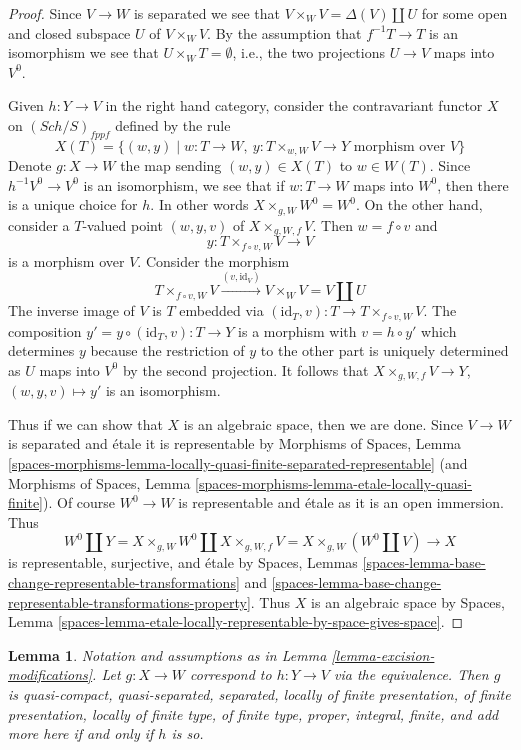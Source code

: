 \documentclass{stacks-project}
\theoremstyle{plain}
\newtheorem{lemma}[subsection]{Lemma}
\theoremstyle{definition}
\theoremstyle{remark}
\numberwithin{equation}{subsection}
\def\Sch{\mathit{Sch}}
\begin{document}
\begin{proof}
Since $V \to W$ is separated we see that
$V \times_W V = \Delta(V) \amalg U$ for some open and closed subspace
$U$ of $V \times_W V$. By the assumption that $f^{-1}T \to T$ is an
isomorphism we see that $U \times_W T = \emptyset$, i.e., the two
projections $U \to V$ maps into $V^0$.

\medskip\noindent
Given $h : Y \to V$ in the right hand category, consider the
contravariant functor $X$ on $(\Sch/S)_{fppf}$ defined by the rule
$$
X(T) = \{(w, y) \mid
w :  T \to W,\ y : T \times_{w, W} V \to Y\text{ morphism over }V\}
$$
Denote $g : X \to W$ the map sending $(w, y) \in X(T)$ to $w \in W(T)$.
Since $h^{-1}V^0 \to V^0$ is an isomorphism, we see that if
$w : T \to W$ maps into $W^0$, then there is a unique choice for $h$.
In other words $X \times_{g, W} W^0 = W^0$. On the other hand, consider
a $T$-valued point $(w, y, v)$ of $X \times_{g, W, f} V$.
Then $w = f \circ v$ and
$$
y : T \times_{f \circ v, W} V \longrightarrow V
$$
is a morphism over $V$. Consider the morphism
$$
T \times_{f \circ v, W} V \xrightarrow{(v, \text{id}_V)}
V \times_W V = V \amalg U
$$
The inverse image of $V$ is $T$ embedded via
$(\text{id}_T, v) : T \to T \times_{f \circ v, W} V$.
The composition $y' = y \circ (\text{id}_T, v) : T \to Y$
is a morphism with $v = h \circ y'$ which determines $y$ because the
restriction of $y$ to the other part is uniquely determined as
$U$ maps into $V^0$ by the second projection. It follows that
$X \times_{g, W, f} V \to Y$, $(w, y, v) \mapsto y'$ is an isomorphism.

\medskip\noindent
Thus if we can show that $X$ is an algebraic space, then we are done.
Since $V \to W$ is separated and \'etale it is representable by
Morphisms of Spaces, Lemma
\ref{spaces-morphisms-lemma-locally-quasi-finite-separated-representable}
(and Morphisms of Spaces, Lemma
\ref{spaces-morphisms-lemma-etale-locally-quasi-finite}).
Of course $W^0 \to W$ is representable and \'etale as it is an
open immersion. Thus
$$
W^0 \amalg Y = X \times_{g, W} W^0 \amalg X \times_{g, W, f} V
= X \times_{g, W} (W^0 \amalg V) \longrightarrow X
$$
is representable, surjective, and \'etale by Spaces, Lemmas
\ref{spaces-lemma-base-change-representable-transformations} and
\ref{spaces-lemma-base-change-representable-transformations-property}.
Thus $X$ is an algebraic
space by Spaces, Lemma
\ref{spaces-lemma-etale-locally-representable-by-space-gives-space}.
\end{proof}

\begin{lemma}
\label{lemma-excision-modifications-properties}
Notation and assumptions as in Lemma \ref{lemma-excision-modifications}.
Let $g : X \to W$ correspond to $h : Y \to V$ via the equivalence.
Then $g$ is quasi-compact, quasi-separated, separated, locally of finite
presentation, of finite presentation, locally of finite type, of finite type,
proper, integral, finite, and add more here if and only if
$h$ is so.
\end{lemma}
\end{document}
